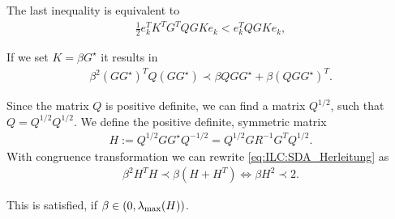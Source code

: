 The last inequality is equivalent to 
\begin{align}
\frac{1}{2}e_k^T K^T G^T Q GK e_k < e_k^T Q GK e_k, 
\end{align}

If we set $K = \beta G^{\star}$ it results in 
\begin{align}
\label{eq:ILC:SDA_Herleitung}
\beta^2 (G G^{\star})^T Q (G G^{\star}) \prec \beta Q G G^{\star} + \beta (Q G G^{\star})^T.
\end{align}

Since the matrix $Q$ is positive definite, we can find a matrix $Q^{1/2}$, such that $Q = Q^{1/2}Q^{1/2}$. We define the positive definite, symmetric matrix
\begin{align}
H:= Q^{1/2} G G^{\star} Q^{-1/2} = Q^{1/2} G R^{-1}G^T Q^{1/2}. 
\end{align}
With congruence transformation we can rewrite \eqref{eq:ILC:SDA_Herleitung} as 
\begin{align}
\beta^2 H^T H \prec \beta (H + H^T) \Leftrightarrow  \beta H^2 \prec 2.
\end{align}

This is satisfied, if $\beta \in (0, \lambda_{\mathrm{max}}(H))$. 


%
%
%


